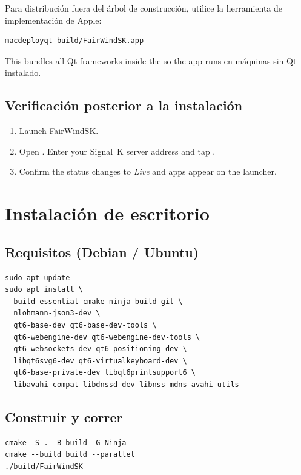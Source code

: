 Para distribución fuera del árbol de construcción, utilice la herramienta de implementación de Apple:

\begin{lstlisting}
macdeployqt build/FairWindSK.app
\end{lstlisting}

This bundles all Qt frameworks inside the  so the app runs
en máquinas sin Qt instalado.

\subsection{Verificación posterior a la instalación}

\begin{enumerate}
  \item Launch FairWindSK.
  \item Open .
        Enter your Signal~K server address and tap .
  \item Confirm the status changes to \textit{Live} and apps appear on the launcher.
\end{enumerate}

\section{Instalación de escritorio}
\label{app:linux}

\subsection{Requisitos (Debian / Ubuntu)}

\begin{lstlisting}
sudo apt update
sudo apt install \
  build-essential cmake ninja-build git \
  nlohmann-json3-dev \
  qt6-base-dev qt6-base-dev-tools \
  qt6-webengine-dev qt6-webengine-dev-tools \
  qt6-websockets-dev qt6-positioning-dev \
  libqt6svg6-dev qt6-virtualkeyboard-dev \
  qt6-base-private-dev libqt6printsupport6 \
  libavahi-compat-libdnssd-dev libnss-mdns avahi-utils
\end{lstlisting}

\subsection{Construir y correr}

\begin{lstlisting}
cmake -S . -B build -G Ninja
cmake --build build --parallel
./build/FairWindSK
\end{lstlisting}

